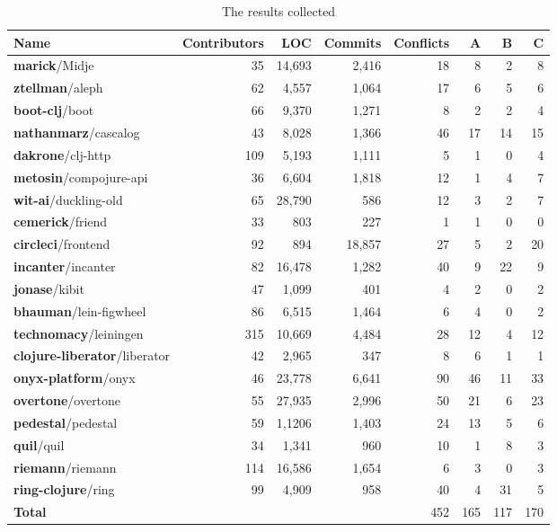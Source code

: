 \documentclass[11pt, titlepage]{article}
\begin{document}
\begin{table}[!h]
\begin{adjustwidth}{-2cm}{}
  \begin{tabular}{ l  r  r  r  r r r  r}
  \toprule
  Name & Contributors & LOC & Commits & Conflicts & A & B & C \\
   \midrule
\textbf{marick}/Midje                 & 35  & 14,693 & 2,416 & 18  & 8 & 2 & 8 \\
\textbf{ztellman}/aleph               & 62  & 4,557  & 1,064 & 17  & 6 & 5 & 6 \\
\textbf{boot-clj}/boot                & 66  & 9,370  & 1,271 & 8  & 2 & 2 & 4 \\
\textbf{nathanmarz}/cascalog          & 43  & 8,028  & 1,366 & 46  & 17 & 14 & 15 \\
\textbf{dakrone}/clj-http             & 109 & 5,193  & 1,111 & 5  & 1 & 0 & 4 \\
\textbf{metosin}/compojure-api        & 36  & 6,604  & 1,818 & 12  & 1 & 4 & 7 \\
\textbf{wit-ai}/duckling-old          & 65  & 28,790 & 586 & 12  & 3 & 2 & 7 \\
\textbf{cemerick}/friend              & 33  & 803   & 227   & 1   & 1 & 0 & 0 \\
\textbf{circleci}/frontend            & 92  & 894   & 18,857   & 27  & 5 & 2 & 20 \\
\textbf{incanter}/incanter            & 82  & 16,478 & 1,282 & 40  & 9 & 22 & 9 \\
\textbf{jonase}/kibit                 & 47  & 1,099  & 401  & 4   & 2 & 0 & 2 \\
\textbf{bhauman}/lein-figwheel        & 86  & 6,515  & 1,464  & 6   & 4 & 0 & 2 \\
\textbf{technomacy}/leiningen         & 315 & 10,669 & 4,484 & 28  & 12 & 4 & 12 \\
\textbf{clojure-liberator}/liberator  & 42  &  2,965 & 347  & 8  & 6 & 1 & 1  \\
\textbf{onyx-platform}/onyx           & 46  & 23,778 & 6,641 & 90 & 46 & 11 & 33 \\
\textbf{overtone}/overtone            & 55  & 27,935 & 2,996 & 50  & 21 & 6 & 23 \\
\textbf{pedestal}/pedestal            & 59  & 1,1206 & 1,403 & 24  & 13 & 5 & 6 \\
\textbf{quil}/quil                    & 34  & 1,341  & 960  & 10  & 1 & 8 & 3 \\
\textbf{riemann}/riemann              & 114 & 16,586 & 1,654 & 6   & 3 & 0 & 3 \\
\textbf{ring-clojure}/ring            & 99  &  4,909 & 958  & 40  & 4 & 31 & 5 \\ \midrule
\textbf{Total}  &     &  &   &   452  & 165 & 117 & 170 \\ \bottomrule
\end{tabular}
\caption{The results collected}
\label{table:repo-stats}
\end{adjustwidth}
\end{table}
\end{document}
